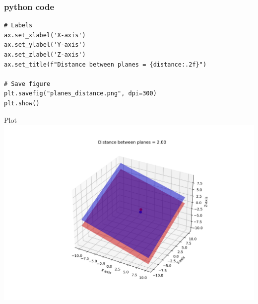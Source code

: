 \documentclass{beamer}
\begin{document}
\begin{frame}[fragile]
    \frametitle{python code }
    \begin{lstlisting}
# Labels
ax.set_xlabel('X-axis')
ax.set_ylabel('Y-axis')
ax.set_zlabel('Z-axis')
ax.set_title(f"Distance between planes = {distance:.2f}")

# Save figure
plt.savefig("planes_distance.png", dpi=300)
plt.show()

    \end{lstlisting}
\end{frame}
\begin{frame}{Plot}
    \centering
    \includegraphics[width=\columnwidth, height=0.8\textheight, keepaspectratio]{figs/planes_distance.png}     
\end{frame}
\end{document}
